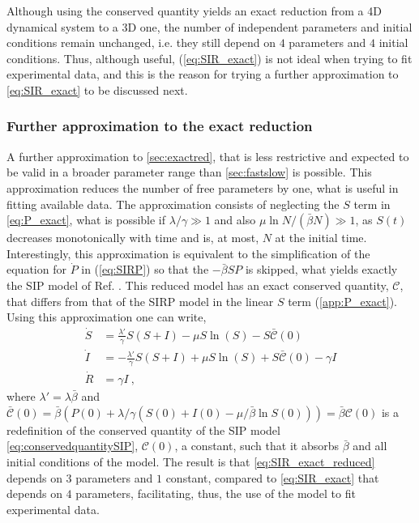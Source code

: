 Although using the conserved quantity yields an exact reduction from a 4D
dynamical system to a 3D one, the number of independent parameters and initial
conditions remain unchanged, i.e. they still depend on $4$ parameters and $4$
initial conditions. Thus, although useful, (\cref{eq:SIR_exact}) is not ideal
when trying to fit experimental data, and this is the reason for trying a
further approximation to \cref{eq:SIR_exact} to be discussed next.

\subsubsection{Further approximation to the exact reduction}
\label{sec:exactredapp}

A further approximation to \cref{sec:exactred}, that is less restrictive
and expected to be valid in a broader parameter range than \cref{sec:fastslow}
is possible. This approximation reduces the number of free parameters by one,
what is useful in fitting available data.
The approximation consists of neglecting the
$S$ term in \cref{eq:P_exact}, what is possible if $\lambda/\gamma\gg 1$
and also $\mu\ln N/(\bar{\beta} N)\gg 1$, as $S(t)$ decreases monotonically
with time and is, at most, $N$ at the initial time. Interestingly, this
approximation is equivalent to the simplification of the equation for $\dot{P}$
in (\cref{eq:SIRP}) so that the $-\bar{\beta}SP$ is skipped, what yields
exactly
the SIP model of Ref. \cite{article_SIP}. This reduced model has an exact
conserved quantity, $\mathcal{C}$, that differs from that of the SIRP model in
the linear $S$ term (\cref{app:P_exact}).
Using this approximation one can write,
\begin{equation}\label{eq:SIR_exact_reduced}
    \begin{aligned}
        \dot{S} & =\frac{\lambda'}{\gamma}S(S+I)-\mu
        S\ln(S)-S\bar{\mathcal{C}}(0)                 \\
        \dot{I} & =-\frac{\lambda'}{\gamma}S(S+I)+\mu
        S\ln(S)+S\bar{\mathcal{C}}(0)-\gamma I        \\
        \dot{R} & =\gamma I \ ,
    \end{aligned}
\end{equation}
where $\lambda'=\lambda\bar{\beta}$ and $\bar{\mathcal{C}}(0)=\bar{\beta}
    (P(0)+\lambda/\gamma(S(0)+I(0)-\mu/\bar{\beta}\ln S(0)))=\bar{\beta}
    \mathcal{C}(0)$ is a redefinition of the conserved quantity of the SIP
model
\cref{eq:conservedquantitySIP}, $\mathcal{C}(0)$, a constant, such that it
absorbs $\bar{\beta}$ and all initial conditions of the model. The result is
that \cref{eq:SIR_exact_reduced} depends on $3$ parameters and $1$ constant,
compared to \cref{eq:SIR_exact} that depends on $4$ parameters,
facilitating, thus, the use of the model to fit experimental data.

